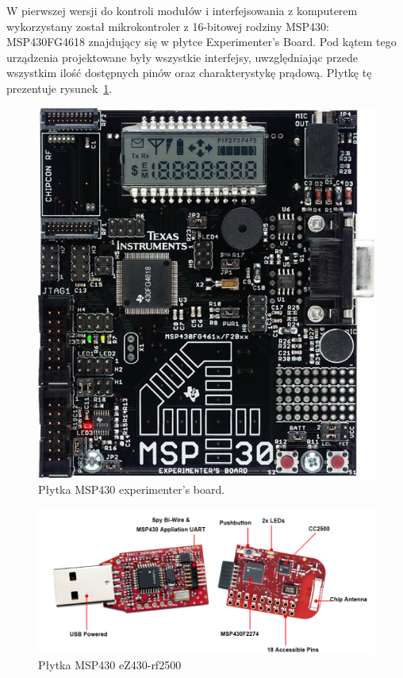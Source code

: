 W pierwszej wersji do kontroli modułów i interfejsowania z komputerem wykorzystany został mikrokontroler z 16-bitowej rodziny MSP430: MSP430FG4618 znajdujący się w płytce Experimenter's Board.
Pod kątem tego urządzenia projektowane były wszystkie interfejsy, uwzględniając przede wszystkim ilość dostępnych pinów oraz charakterystykę prądową.
Płytkę tę prezentuje rysunek~\ref{fig:msp430_exp}.

\begin{figure}
 \includegraphics[width=\textwidth]{gfx/exp43000}
 \caption{Płytka MSP430 experimenter's board.}
 \label{fig:msp430_exp}
\end{figure}

\begin{figure}
 \centering
 \includegraphics[width=\textwidth]{gfx/ez430-rf2500}
 \caption{Płytka MSP430 eZ430-rf2500}
 \label{fig:msp430_ez430}
\end{figure}

